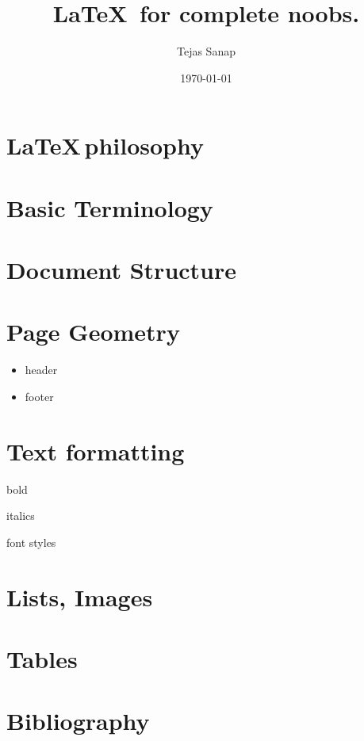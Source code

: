 \documentclass{article}
\title{\LaTeX\, for complete noobs.}
\author{Tejas Sanap}
\date{\today}
\begin{document}
	\maketitle

	\section{\LaTeX\,philosophy}
		
	\section{Basic Terminology}

	\section{Document Structure}

	\section{Page Geometry}

		\begin{itemize}
			\item header
			\item footer
		\end{itemize}

	\section{Text formatting}

		\begin{itemized}
			\item bold
			\item italics
			\item font styles
		\end{itemized}
	
	\section{Lists, Images}

	\section{Tables}

	\section{Bibliography}
\end{document}

